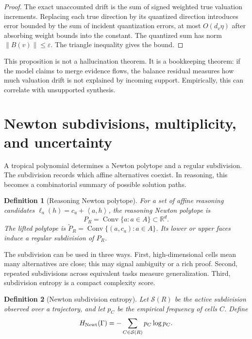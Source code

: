 \documentclass[11pt]{article}
\newtheorem{definition}{Definition}[section]
\newcommand{\R}{\mathbb{R}}
\newcommand{\calS}{\mathcal{S}}
\newcommand{\Conv}{\operatorname{Conv}}
\newcommand{\norm}[1]{\left\lVert #1\right\rVert}
\newcommand{\ip}[2]{\left\langle #1,#2\right\rangle}
\newcommand{\eps}{\varepsilon}
\begin{document}
\begin{proof}
The exact unaccounted drift is the sum of signed weighted true valuation increments.  Replacing each true direction by its quantized direction introduces error bounded by the sum of incident quantization errors, at most \(O(d_v\eta)\) after absorbing weight bounds into the constant.  The quantized sum has norm \(\norm{B(v)}\le\eps\).  The triangle inequality gives the bound.
\end{proof}

This proposition is not a hallucination theorem.  It is a bookkeeping theorem: if the model claims to merge evidence flows, the balance residual measures how much valuation drift is not explained by incoming support.  Empirically, this can correlate with unsupported synthesis.

\section{Newton subdivisions, multiplicity, and uncertainty}

A tropical polynomial determines a Newton polytope and a regular subdivision.  The subdivision records which affine alternatives coexist.  In reasoning, this becomes a combinatorial summary of possible solution paths.

\begin{definition}[Reasoning Newton polytope]
For a set of affine reasoning candidates \(\ell_a(h)=c_a+\ip{a}{h}\), the reasoning Newton polytope is
\begin{equation}
P_R=\Conv\{a:a\in A\}\subset\R^d.
\end{equation}
The lifted polytope is \(\tilde P_R=\Conv\{(a,c_a):a\in A\}\).  Its lower or upper faces induce a regular subdivision of \(P_R\).
\end{definition}

The subdivision can be used in three ways.  First, high-dimensional cells mean many alternatives are close; this may signal ambiguity or a rich proof.  Second, repeated subdivisions across equivalent tasks measure generalization.  Third, subdivision entropy is a compact complexity score.

\begin{definition}[Newton subdivision entropy]
Let \(\calS(R)\) be the active subdivision observed over a trajectory, and let \(p_C\) be the empirical frequency of cells \(C\).  Define
\begin{equation}
H_{\rm Newt}(\Gamma)=-\sum_{C\in\calS(R)}p_C\log p_C.
\end{equation}
\end{definition}
\end{document}

